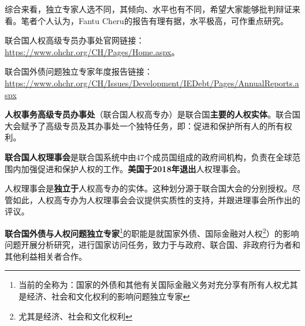 综合来看，独立专家人选不同，其倾向、水平也有不同，希望大家能够批判辩证来看。笔者个人认为，Fantu Cheru的报告有理有据，水平极高，可作重点研究。

联合国人权高级专员办事处官网链接：\url{https://www.ohchr.org/CH/Pages/Home.aspx}。

联合国外债问题独立专家年度报告链接：\url{https://www.ohchr.org/CH/Issues/Development/IEDebt/Pages/AnnualReports.aspx}


\textbf{人权事务高级专员办事处}（联合国人权高专办）是联合国\textbf{主要的人权实体}。联合国大会赋予了高级专员及其办事处一个独特任务，即：促进和保护所有人的所有权利。

\textbf{联合国人权理事会}是联合国系统中由47个成员国组成的政府间机构，负责在全球范围内加强促进和保护人权的工作。\textbf{美国于2018年退出}人权理事会。

人权理事会是\textbf{独立于}人权高专办的实体。这种划分源于联合国大会的分别授权。尽管如此，人权高专办为人权理事会会议提供实质性的支持，并跟进理事会所作出的评议。

\textbf{联合国外债与人权问题独立专家}\footnote{当前的全称为：国家的外债和其他有关国际金融义务对充分享有所有人权尤其是经济、社会和文化权利的影响问题独立专家}的职能是就国家外债、国际金融对人权\footnote{尤其是经济、社会和文化权利}）的影响问题开展分析研究，进行国家访问任务，致力于与政府、联合国、非政府行为者和其他利益相关者合作。


